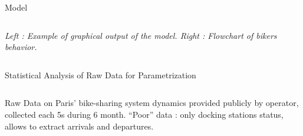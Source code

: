 \documentclass{beamer}
\begin{document}
\begin{frame}{}
\begin{columns}[t]
\begin{column}{.49\textwidth}
\begin{block}{Model}
\begin{columns}[t]
\begin{column}{.95\textwidth}
\begin{justify}
\textit{\small Left : Example of graphical output of the model. Right : Flowchart of bikers behavior.}


\end{justify}
          \end{column}
          \end{columns}
        \end{block}


        


        
        \begin{block}{Statistical Analysis of Raw Data for Parametrization}
       \vspace{-2cm}
        \begin{columns}[t]
        \begin{column}{.95\textwidth}
        \begin{justify}
        
        Raw Data on Paris' bike-sharing system dynamics provided publicly by operator, collected each 5s during 6 month. ``Poor'' data : only docking stations status, allows to extract arrivals and departures.
        
        
        

\end{justify}
\end{column}
\end{columns}
\end{block}
\end{column}
\end{columns}
\end{frame}
\end{document}
